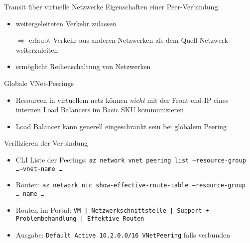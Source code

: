 
\begin{flashcard}[Definition]{Transit über virtuelle Netzwerke}
    Eigenschaften einer Peer-Verbindung:
    \begin{itemize}
        \item weitergeleiteten Verkehr zulassen
        \item[$\Rightarrow$] erlaubt Verkehr aus anderen Netzwerken als dem Quell-Netzwerk weiterzuleiten
        \item ermöglicht Reihenschaltung von Netzwerken
    \end{itemize}
\end{flashcard}

\begin{flashcard}[Definition]{Globale VNet-Peerings}
    \begin{itemize}
        \item Resourcen in virtuellem netz können \emph{nicht} mit der Front-end-IP eines internen Load Balancers im Basic SKU kommunizieren
        \item Load Balancer kann generell eingeschränkt sein bei globalem Peering
    \end{itemize}
\end{flashcard}


\begin{flashcard}[Definition]{Verifizieren der Verbindung}
    \begin{itemize}
        \item CLI Liste der Peerings:\newline
            \texttt{az network vnet peering list --resource-group \ldots --vnet-name \ldots}
        \item Routen:\newline
            \texttt{az network nic show-effective-route-table --resource-group \ldots --name \ldots}
        \item Routen im Portal:\newline
            \texttt{VM | Netzwerkschnittstelle | Support + Problembehandlung | Effektive Routen}
        \item Ausgabe:
            \texttt{Default   Active   10.2.0.0/16       VNetPeering} falls verbunden
    \end{itemize}
\end{flashcard}

